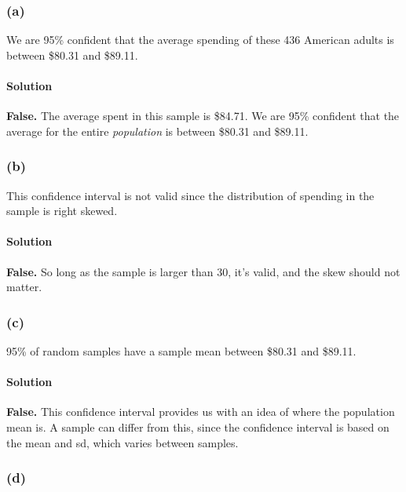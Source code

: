 \documentclass[]{article}
\let\oldparagraph\paragraph
\renewcommand{\paragraph}[1]{\oldparagraph{#1}\mbox{}}
\begin{document}
\subsubsection{(a)}\label{a-1}

We are 95\% confident that the average spending of these 436 American
adults is between \$80.31 and \$89.11.

\paragraph{Solution}\label{solution-5}

\textbf{False.} The average spent in this sample is \$84.71. We are 95\%
confident that the average for the entire \emph{population} is between
\$80.31 and \$89.11.

\subsubsection{(b)}\label{b-1}

This confidence interval is not valid since the distribution of spending
in the sample is right skewed.

\paragraph{Solution}\label{solution-6}

\textbf{False.} So long as the sample is larger than 30, it's valid, and
the skew should not matter.

\subsubsection{(c)}\label{c-1}

95\% of random samples have a sample mean between \$80.31 and \$89.11.

\paragraph{Solution}\label{solution-7}

\textbf{False.} This confidence interval provides us with an idea of
where the population mean is. A sample can differ from this, since the
confidence interval is based on the mean and sd, which varies between
samples.

\subsubsection{(d)}\label{d-1}
\end{document}
